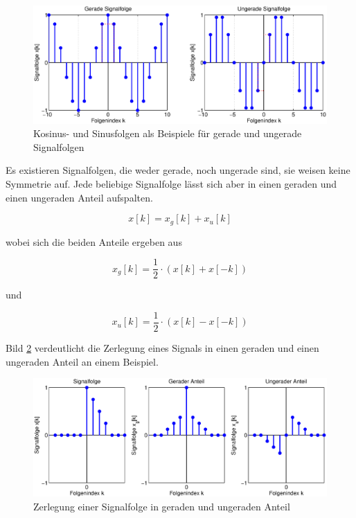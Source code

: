 \begin{figure}[H]
  \centerline{\includegraphics[width=1\textwidth]{Kapitel3/Bilder/image5.eps}}
  \caption{Kosinus- und Sinusfolgen als Beispiele für gerade und ungerade Signalfolgen}
  \label{fig:GeardeUngeradeFolgen}
\end{figure}

\noindent Es existieren Signalfolgen, die weder gerade, noch ungerade sind, sie weisen keine Symmetrie auf. Jede beliebige Signalfolge l\"{a}sst sich aber in einen geraden und einen ungeraden Anteil aufspalten. 

\begin{equation}\label{eq:threefivteen}
x\left[k\right]=x_{g} \left[k\right]+x_{u} \left[k\right]
\end{equation}

\noindent wobei sich die beiden Anteile ergeben aus

\begin{equation}\label{eq:threesixteen}
x_{g} \left[k\right]=\frac{1}{2} \cdot \left(x\left[k\right]+x\left[-k\right]\right)
\end{equation}

\noindent und

\begin{equation}\label{eq:threeseventeen}
x_{u} \left[k\right]=\frac{1}{2} \cdot \left(x\left[k\right]-x\left[-k\right]\right)
\end{equation}

\noindent Bild \ref{fig:GeraderUngeraderAnteil} verdeutlicht die Zerlegung eines Signals in einen geraden und einen ungeraden Anteil an einem Beispiel.

\begin{figure}[H]
  \centerline{\includegraphics[width=1\textwidth]{Kapitel3/Bilder/image6.eps}}
  \caption{Zerlegung einer Signalfolge in geraden und ungeraden Anteil}
  \label{fig:GeraderUngeraderAnteil}
\end{figure}

